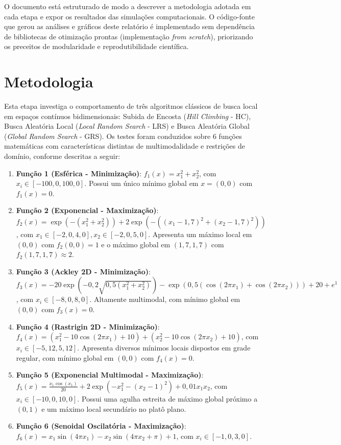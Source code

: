 \documentclass[journal,onecolumn]{IEEEtran}
\begin{document}
O documento está estruturado de modo a descrever a metodologia adotada em cada etapa e expor os resultados das simulações computacionais. O código-fonte que gerou as análises e gráficos deste relatório é implementado sem dependência de bibliotecas de otimização prontas (implementação \textit{from scratch}), priorizando os preceitos de modularidade e reprodutibilidade científica.

\section{Metodologia}

Esta etapa investiga o comportamento de três algoritmos clássicos de busca local em espaços contínuos bidimensionais: Subida de Encosta (\textit{Hill Climbing} - HC), Busca Aleatória Local (\textit{Local Random Search} - LRS) e Busca Aleatória Global (\textit{Global Random Search} - GRS). Os testes foram conduzidos sobre 6 funções matemáticas com características distintas de multimodalidade e restrições de domínio, conforme descritas a seguir:
\begin{enumerate}
    \item \textbf{Função 1 (Esférica - Minimização)}: $f_1(x) = x_1^2 + x_2^2$, com $x_i \in [-100{,}0, 100{,}0]$. Possui um único mínimo global em $x = (0,0)$ com $f_1(x) = 0$.
    \item \textbf{Função 2 (Exponencial - Maximização)}: $f_2(x) = \exp(-(x_1^2 + x_2^2)) + 2\exp(-((x_1-1{,}7)^2 + (x_2-1{,}7)^2))$, com $x_1 \in [-2{,}0, 4{,}0], x_2 \in [-2{,}0, 5{,}0]$. Apresenta um máximo local em $(0,0)$ com $f_2(0,0)=1$ e o máximo global em $(1{,}7, 1{,}7)$ com $f_2(1{,}7, 1{,}7) \approx 2$.
    \item \textbf{Função 3 (Ackley 2D - Minimização)}: $f_3(x) = -20\exp\left(-0{,}2\sqrt{0{,}5(x_1^2+x_2^2)}\right) - \exp\left(0{,}5(\cos(2\pi x_1) + \cos(2\pi x_2))\right) + 20 + e^1$, com $x_i \in [-8{,}0, 8{,}0]$. Altamente multimodal, com mínimo global em $(0,0)$ com $f_3(x) = 0$.
    \item \textbf{Função 4 (Rastrigin 2D - Minimização)}: $f_4(x) = (x_1^2 - 10\cos(2\pi x_1) + 10) + (x_2^2 - 10\cos(2\pi x_2) + 10)$, com $x_i \in [-5{,}12, 5{,}12]$. Apresenta diversos mínimos locais dispostos em grade regular, com mínimo global em $(0,0)$ com $f_4(x) = 0$.
    \item \textbf{Função 5 (Exponencial Multimodal - Maximização)}: $f_5(x) = \frac{x_1\cos(x_1)}{20} + 2\exp(-x_1^2 - (x_2-1)^2) + 0{,}01 x_1 x_2$, com $x_i \in [-10{,}0, 10{,}0]$. Possui uma agulha estreita de máximo global próximo a $(0,1)$ e um máximo local secundário no platô plano.
    \item \textbf{Função 6 (Senoidal Oscilatória - Maximização)}: $f_6(x) = x_1\sin(4\pi x_1) - x_2\sin(4\pi x_2 + \pi) + 1$, com $x_i \in [-1{,}0, 3{,}0]$.
\end{enumerate}
\end{document}
